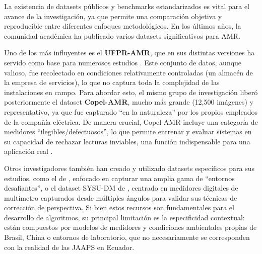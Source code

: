 La existencia de datasets públicos y benchmarks estandarizados es vital para el avance de la investigación, ya que permite una comparación objetiva y reproducible entre diferentes enfoques metodológicos. En los últimos años, la comunidad académica ha publicado varios datasets significativos para AMR.

Uno de los más influyentes es el \textbf{UFPR-AMR}, que en sus distintas versiones ha servido como base para numerosos estudios \parencite{Laroca2021Towards}. Este conjunto de datos, aunque valioso, fue recolectado en condiciones relativamente controladas (un almacén de la empresa de servicios), lo que no captura toda la complejidad de las instalaciones en campo. Para abordar esto, el mismo grupo de investigación liberó posteriormente el dataset \textbf{Copel-AMR}, mucho más grande (12,500 imágenes) y representativo, ya que fue capturado ``en la naturaleza'' por los propios empleados de la compañía eléctrica. De manera crucial, Copel-AMR incluye una categoría de medidores ``ilegibles/defectuosos'', lo que permite entrenar y evaluar sistemas en su capacidad de rechazar lecturas inviables, una función indispensable para una aplicación real \parencite{Laroca2021Towards}.

Otros investigadores también han creado y utilizado datasets específicos para sus estudios, como el de \textcite{Hong2021ImageBased}, enfocado en capturar una amplia gama de ``entornos desafiantes'', o el dataset SYSU-DM de \textcite{Peng2023Deep}, centrado en medidores digitales de multímetro capturados desde múltiples ángulos para validar sus técnicas de corrección de perspectiva. Si bien estos recursos son fundamentales para el desarrollo de algoritmos, su principal limitación es la especificidad contextual: están compuestos por modelos de medidores y condiciones ambientales propias de Brasil, China o entornos de laboratorio, que no necesariamente se corresponden con la realidad de las JAAPS en Ecuador.

